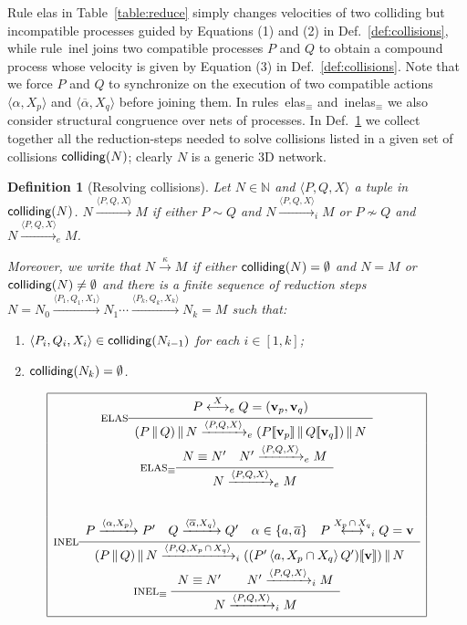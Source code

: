 \documentclass[11pt]{article}
\newcommand{\lsbrace}{\ensuremath{|\![}}
\newcommand{\rsbrace}{\ensuremath{]\!|}}
\newcommand{\comp}{\sim}
\newcommand{\vect}[1]{\mathbf{#1}}
\newcommand{\ch}[2]{\ensuremath{\langle #1, #2 \rangle}}
\newcommand{\colliding}{{\sf colliding}}
\newcommand{\unionc}[1]{\,\langle #1 \rangle\,}
\def\sos#1#2{{\def\arraystretch{1.6}\begin{array}{c}#1\\\hline
#2\end{array}}}
\newcommand{\nar}[1]{\xrightarrow{#1}}
\newcommand{\enar}[1]{\xrightarrow{#1}_{e}}
\newcommand{\inar}[1]{\xrightarrow{#1}_{i}}
\newcommand{\nets}{{\mathbb N}}
\def\name#1{\mbox{\sc #1}}
\newcommand{\collision}[2]{\stackrel{{#1}}{\longleftrightarrow}_{#2}}
\newtheorem{definition}{Definition}
\begin{document}
Rule \name{elas} in Table~\ref{table:reduce} simply changes velocities of two colliding but
incompatible processes guided by Equations (1) and (2) in Def.~\ref{def:collisions}, while
rule~\name{inel} joins two compatible processes $P$ and $Q$ to obtain a compound process
whose velocity is given by Equation (3) in Def.~\ref{def:collisions}. Note that we force $P$ and $Q$
to synchronize on the execution of two compatible actions $\ch{\alpha}{X_p}$ and
$\ch{\overline{\alpha}}{X_q}$ before joining them. In rules~\name{elas$_\equiv$}
and~\name{inelas$_\equiv$} we also consider structural congruence over nets of processes.
In Def.~\ref{def:reductionrules} we collect together all the reduction-steps needed to
solve collisions listed in a given set of collisions $\colliding(N)$; clearly $N$ is a generic  3D
network.

\begin{definition}[Resolving  collisions]
\label{def:reductionrules}
Let $N \in \nets$ and $\langle P, Q, X \rangle$ a tuple in $\colliding(N)$. $N
\nar{\langle P,Q, X \rangle} M$ if either $P \comp Q$ and $N \inar{\langle P,Q, X \rangle} M$ or $P \not\comp Q$ and $N \enar{\langle P,Q, X \rangle} M$.

Moreover, we write that $N \nar{\kappa} M$ if either $\colliding(N) = \emptyset$ and $N=M$  or
$\colliding(N) \neq \emptyset$ and there is a finite sequence of reduction
steps $N = N_0 \nar{\langle P_1,Q_1, X_1 \rangle} N_1 \cdots \nar{\langle P_k,Q_k, X_k \rangle} N_k = M$ such that:
\begin{enumerate}
\item $\langle P_{i},Q_i, X_i \rangle \in \colliding(N_{i-1})$ for each $i \in [1, k]$;
\item $\colliding(N_k) = \emptyset$.
\end{enumerate}
\end{definition}


\begin{table}[tbh]
$$
\begin{array}{|c|}
\hline
\name{elas} \sos{P \collision{X}{e} Q = (\vect{v}_p,\vect{v}_q)}{(P \,\|\, Q) \,\|\, N \enar{\langle P,Q,X \rangle} (P \lsbrace \vect{v}_p\rsbrace \,\|\, Q\lsbrace
\vect{v}_q \rsbrace) \,\|\, N}\\
\name{elas$_\equiv$}\sos{N \equiv N' \quad N' \enar{\langle P, Q, X \rangle} M} { N \enar{\langle P, Q, X \rangle} M}\\ \\
\name{inel} \sos{P \nar{\langle \alpha, X_p\rangle} P' \quad Q \nar{\langle \overline{\alpha}, X_q \rangle} Q' \quad
\alpha \in \{a,\overline{a} \}  \quad P \collision{X_p \,\cap\, X_q}{i} Q = \vect{v}}{(P \,\|\, Q) \,\|\, N \inar{\langle P, Q, X_p \,\cap\, X_q \rangle}
((P' \unionc{a,X_p \cap X_q} Q') \lsbrace \vect{v} \rsbrace) \,\|\, N
}\\
\name{inel$_\equiv$} \; \sos{N \equiv N' \qquad
N' \inar{\langle P, Q, X \rangle} M}
{N \inar{\langle P, Q, X \rangle} M }\\
\hline
\end{array}$$
\caption{Reaction rules for elastic and inelastic collisions}
\label{table:reduce}
\end{table}
\end{document}
